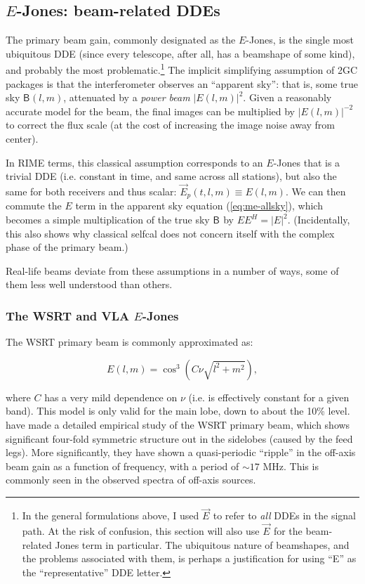 \documentclass{aa}
\newcommand{\herm}{H}
\newcommand{\jones}[2]{\vec {#1}_{#2}}
\newcommand{\coh}[2]{\mathsf{{#1}}_{{#2}}}
\begin{document}
\subsection{$E$-Jones: beam-related DDEs\label{sec:EJones}}

The primary beam gain, commonly designated as the $E$-Jones, is the single most ubiquitous DDE (since every telescope, after all, has a beamshape of some kind), and probably the most problematic.\footnote{In the general formulations above, I used $\jones{E}{}$ to refer to {\em all} DDEs in the signal path. At the risk of confusion, this section will also use  $\jones{E}{}$ for the beam-related Jones term in particular. The ubiquitous nature of beamshapes, and the problems associated with them, is perhaps a justification for using ``E'' as the ``representative'' DDE letter.} The implicit simplifying assumption of 2GC packages is that the interferometer observes an ``apparent sky'': that is, some true sky $\coh{B}{}(l,m)$, attenuated by a {\em power beam} $|E(l,m)|^2$. Given a reasonably accurate model for the beam, the final images can be multiplied by $|E(l,m)|^{-2}$ to correct the flux scale (at the cost of increasing the image noise away from center).

In RIME terms, this classical assumption corresponds to an $E$-Jones that is a trivial DDE (i.e. constant in time, and same across all stations), but also the same for both receivers and thus scalar: $\jones{E}{p}(t,l,m) \equiv E(l,m)$. We can then commute the $E$ term in the apparent sky equation (\ref{eq:me-allsky}), which becomes
a simple multiplication of the true sky $\coh{B}{}$ by $EE^\herm=|E|^2.$ (Incidentally, this also shows why classical selfcal does not concern itself with the complex phase of the primary beam.) 

Real-life beams deviate from these assumptions in a number of ways, some of them less well understood than others.

\subsubsection{The WSRT and VLA $E$-Jones\label{sec:EJones:wsrt}\label{sec:EJones:vla}}

The WSRT primary beam is commonly approximated as:

\[
E(l,m) = \cos^3(C\nu\sqrt{l^2+m^2}),
\]

where $C$ has a very mild dependence on $\nu$ (i.e. is effectively constant for a given band). This model is only valid for the main lobe, down to about the 10\% level. \citet{Popping-Braun:WSRT-beam} have made a detailed empirical study of the WSRT primary beam, which shows significant four-fold symmetric structure out in the sidelobes (caused by the feed legs). More significantly, they have shown a quasi-periodic ``ripple'' in the off-axis beam gain as a function of frequency, with a period of $\sim17$ MHz. This is commonly seen in the observed spectra of off-axis sources.
\end{document}
